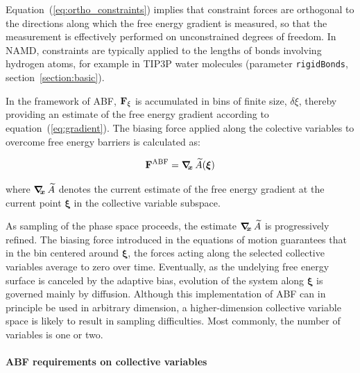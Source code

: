 Equation~(\ref{eq:ortho_constraints}) implies that constraint forces
are orthogonal to the directions along which the free energy gradient is
measured, so that the measurement is effectively performed on unconstrained
degrees of freedom. In NAMD, constraints are typically applied to the lengths of
bonds involving hydrogen atoms, for example in TIP3P water molecules
(parameter \texttt{rigidBonds}, section~\ref{section:basic}).


In the framework of ABF,
${\bf F}_\xi$ is accumulated in bins of finite size, $\delta \xi$,
thereby providing an estimate of the free energy gradient
according to equation~({\ref{eq:gradient}}).
The biasing force applied along the colective variables
to overcome free energy barriers is calculated as:

\begin{equation}
  \label{eq:abf}
  {\bf F}^{\rm ABF} = \mbox{\boldmath$\nabla_{\!\!x}\,$} \widetilde A({\mbox{\boldmath{$\xi$}}})
\end{equation}

where $\mbox{\boldmath$\nabla_{\!\!x}\,$} \widetilde A$ denotes the current estimate of the
free energy gradient at the current point $\bm{\xi}$ in the collective
variable subspace.

As sampling of the phase space proceeds, the estimate
$\mbox{\boldmath$\nabla_{\!\!x}\,$} \widetilde A$ is progressively refined. The biasing
force introduced in the equations of motion guarantees that in
the bin centered around $\bm{\xi}$,
the forces acting along the selected collective variables average
to zero over time. Eventually, as the undelying free energy surface is canceled
by the adaptive bias, evolution of the system along $\bm{\xi}$
is governed mainly by diffusion.
Although this implementation of ABF can in principle be used in 
arbitrary dimension, a higher-dimension collective variable space is likely
to result in sampling difficulties.
Most commonly, the number of variables is one or two.


\paragraph*{ABF requirements on collective variables}
\label{sec:colvarbias_abf_req}

